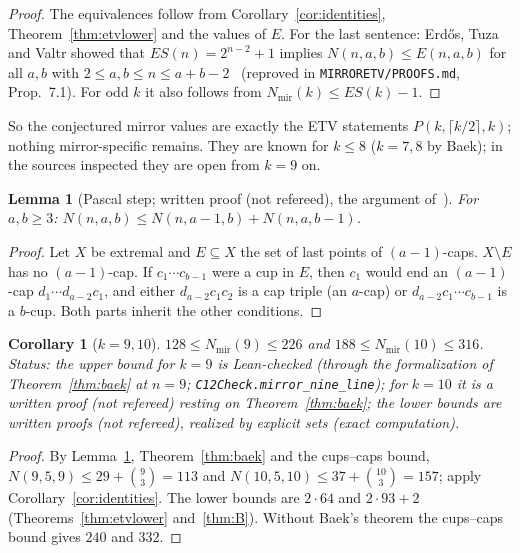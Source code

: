 \documentclass[10pt]{article}
\newtheorem{lemma}[theorem]{Lemma}
\newtheorem{corollary}[theorem]{Corollary}
\theoremstyle{definition}
\theoremstyle{remark}
\newcommand{\Nm}{N_{\mathrm{mir}}}
\newcommand{\dirn}[1]{{\upshape\nolinkurl{#1}}}
\newcommand{\lean}[1]{{\upshape\nolinkurl{#1}}}
\begin{document}
\begin{proof}
The equivalences follow from Corollary~\ref{cor:identities}, Theorem~\ref{thm:etvlower} and the values of $E$. For the
last sentence: Erd\H{o}s, Tuza and Valtr showed that $ES(n)=2^{n-2}+1$ implies $N(n,a,b)\le E(n,a,b)$ for all
$a,b$ with $2\le a,b\le n\le a+b-2$~\cite[Thm.~1.5]{Bae25} (reproved in \dirn{MIRRORETV/PROOFS.md}, Prop.~7.1). For odd $k$ it also follows from
$\Nm(k)\le ES(k)-1$.
\end{proof}

So the conjectured mirror values are exactly the ETV statements $P(k,\lceil k/2\rceil,k)$; nothing mirror-specific
remains. They are known for $k\le8$ ($k=7,8$ by Baek); in the sources inspected they are open from $k=9$ on.

\begin{lemma}[Pascal step; written proof (not refereed), the argument of~\cite{ES35}]\label{lem:pascal}
For $a,b\ge3$: $N(n,a,b)\le N(n,a-1,b)+N(n,a,b-1)$.
\end{lemma}

\begin{proof}
Let $X$ be extremal and $E\subseteq X$ the set of last points of $(a-1)$-caps. $X\setminus E$ has no $(a-1)$-cap. If
$c_1\cdots c_{b-1}$ were a cup in $E$, then $c_1$ would end an $(a-1)$-cap $d_1\cdots d_{a-2}c_1$, and either
$d_{a-2}c_1c_2$ is a cap triple (an $a$-cap) or $d_{a-2}c_1\cdots c_{b-1}$ is a $b$-cup. Both parts inherit the other
conditions.
\end{proof}

\begin{corollary}[$k=9,10$]\label{cor:910}
$128\le\Nm(9)\le226$ and $188\le\Nm(10)\le316$. \emph{Status:} the upper bound for $k=9$ is Lean-checked (through the
formalization of Theorem~\ref{thm:baek} at $n=9$; \lean{C12Check.mirror_nine_line}); for $k=10$ it is a written proof
(not refereed) resting on Theorem~\ref{thm:baek}; the lower bounds are written proofs (not refereed), realized by
explicit sets (exact computation).
\end{corollary}

\begin{proof}
By Lemma~\ref{lem:pascal}, Theorem~\ref{thm:baek} and the cups--caps bound, $N(9,5,9)\le29+\binom93=113$ and
$N(10,5,10)\le37+\binom{10}3=157$; apply Corollary~\ref{cor:identities}. The lower bounds are $2\cdot64$ and $2\cdot93+2$
(Theorems~\ref{thm:etvlower} and~\ref{thm:B}). Without Baek's theorem the cups--caps bound gives $240$ and $332$.
\end{proof}
\end{document}

